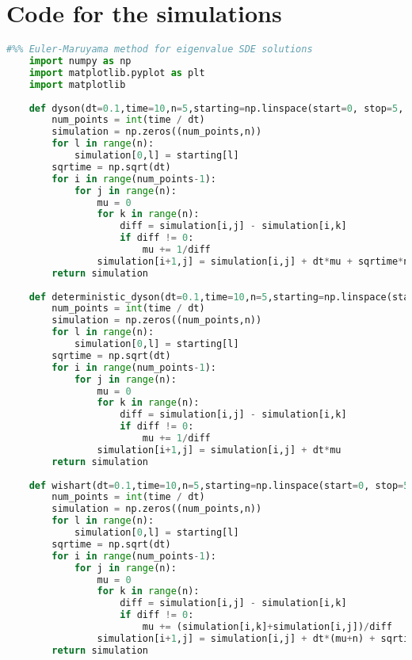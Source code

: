 \chapter{Code for the simulations}

\begin{lstlisting}[language=Python, caption=Euler-Maruyama algorithm for simulation of eigenvalue processes]
    #%% Euler-Maruyama method for eigenvalue SDE solutions
    import numpy as np
    import matplotlib.pyplot as plt
    import matplotlib
    
    def dyson(dt=0.1,time=10,n=5,starting=np.linspace(start=0, stop=5, num=5)):
        num_points = int(time / dt)
        simulation = np.zeros((num_points,n))
        for l in range(n):
            simulation[0,l] = starting[l]
        sqrtime = np.sqrt(dt)
        for i in range(num_points-1):
            for j in range(n):
                mu = 0
                for k in range(n):
                    diff = simulation[i,j] - simulation[i,k]
                    if diff != 0:
                        mu += 1/diff
                simulation[i+1,j] = simulation[i,j] + dt*mu + sqrtime*np.random.randn()
        return simulation
    
    def deterministic_dyson(dt=0.1,time=10,n=5,starting=np.linspace(start=0, stop=5, num=5)):
        num_points = int(time / dt)
        simulation = np.zeros((num_points,n))
        for l in range(n):
            simulation[0,l] = starting[l]
        sqrtime = np.sqrt(dt)
        for i in range(num_points-1):
            for j in range(n):
                mu = 0
                for k in range(n):
                    diff = simulation[i,j] - simulation[i,k]
                    if diff != 0:
                        mu += 1/diff
                simulation[i+1,j] = simulation[i,j] + dt*mu
        return simulation
    
    def wishart(dt=0.1,time=10,n=5,starting=np.linspace(start=0, stop=5, num=5)):
        num_points = int(time / dt)
        simulation = np.zeros((num_points,n))
        for l in range(n):
            simulation[0,l] = starting[l]
        sqrtime = np.sqrt(dt)
        for i in range(num_points-1):
            for j in range(n):
                mu = 0
                for k in range(n):
                    diff = simulation[i,j] - simulation[i,k]
                    if diff != 0:
                        mu += (simulation[i,k]+simulation[i,j])/diff
                simulation[i+1,j] = simulation[i,j] + dt*(mu+n) + sqrtime*np.random.randn()*np.sqrt(simulation[i,j])
        return simulation
    

\end{lstlisting}
